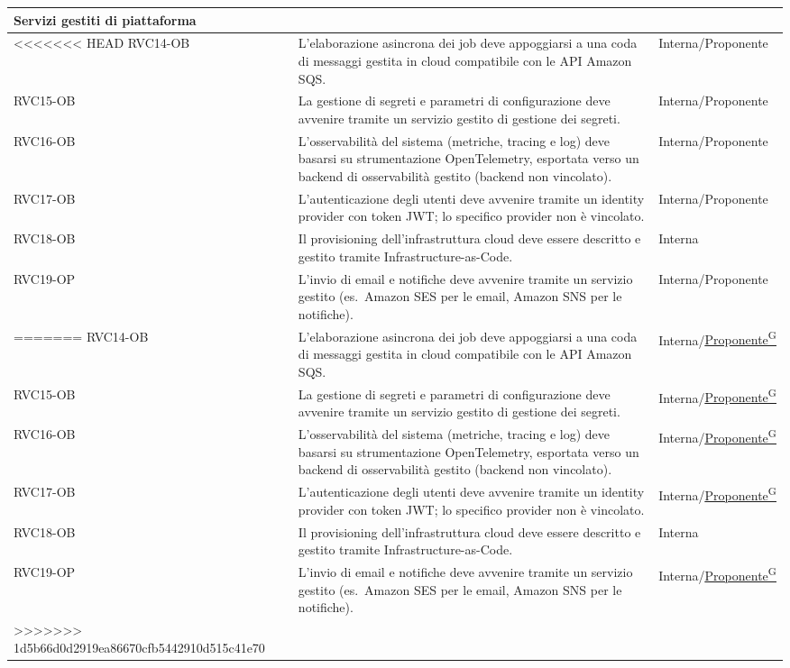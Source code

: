 ﻿\documentclass[a4paper,12pt]{article}
\providecommand{\glslink}[2]{\href{https://alittlebyte-19.github.io/Documentazione/glossario.html\#gls-#1}{\underline{#2}\textsuperscript{\scriptsize G}}}
\begin{document}
\begin{description}[style=multiline, leftmargin=4cm, font=\bfseries]
\begin{enumerate}[leftmargin=*, nosep]
{\begin{longtable}{|p{2.5cm}|p{9.5cm}|p{3.5cm}|}
    \multicolumn{3}{|l|}{\cellcolor{gray!12}\textbf{Servizi gestiti di piattaforma}} \\
    \hline
<<<<<<< HEAD
    RVC14-OB & L'elaborazione asincrona dei job deve appoggiarsi a una coda di messaggi gestita in cloud compatibile con le API Amazon SQS. & Interna/Proponente \\
    \hline
    RVC15-OB & La gestione di segreti e parametri di configurazione deve avvenire tramite un servizio gestito di gestione dei segreti. & Interna/Proponente \\
    \hline
    RVC16-OB & L'osservabilità del sistema (metriche, tracing e log) deve basarsi su strumentazione OpenTelemetry, esportata verso un backend di osservabilità gestito (backend non vincolato). & Interna/Proponente \\
    \hline
    RVC17-OB & L'autenticazione degli utenti deve avvenire tramite un identity provider con token JWT; lo specifico provider non è vincolato. & Interna/Proponente \\
    \hline
    RVC18-OB & Il provisioning dell'infrastruttura cloud deve essere descritto e gestito tramite Infrastructure-as-Code. & Interna \\
    \hline
    RVC19-OP & L'invio di email e notifiche deve avvenire tramite un servizio gestito (es.\ Amazon SES per le email, Amazon SNS per le notifiche). & Interna/Proponente \\
=======
    RVC14-OB & L'elaborazione asincrona dei job deve appoggiarsi a una coda di messaggi gestita in cloud compatibile con le API Amazon SQS. & Interna/\glslink{committente-proponente}{Proponente} \\
    \hline
    RVC15-OB & La gestione di segreti e parametri di configurazione deve avvenire tramite un servizio gestito di gestione dei segreti. & Interna/\glslink{committente-proponente}{Proponente} \\
    \hline
    RVC16-OB & L'osservabilità del sistema (metriche, tracing e log) deve basarsi su strumentazione OpenTelemetry, esportata verso un backend di osservabilità gestito (backend non vincolato). & Interna/\glslink{committente-proponente}{Proponente} \\
    \hline
    RVC17-OB & L'autenticazione degli utenti deve avvenire tramite un identity provider con token JWT; lo specifico provider non è vincolato. & Interna/\glslink{committente-proponente}{Proponente} \\
    \hline
    RVC18-OB & Il provisioning dell'infrastruttura cloud deve essere descritto e gestito tramite Infrastructure-as-Code. & Interna \\
    \hline
    RVC19-OP & L'invio di email e notifiche deve avvenire tramite un servizio gestito (es.\ Amazon SES per le email, Amazon SNS per le notifiche). & Interna/\glslink{committente-proponente}{Proponente} \\
>>>>>>> 1d5b66d0d2919ea86670cfb5442910d515c41e70
    \hline



\end{longtable}}
\end{enumerate}
\end{description}
\end{document}
